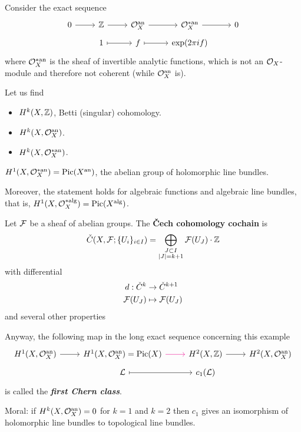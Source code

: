 \begin{example}
	Consider the exact sequence
	\[\begin{tikzcd}[row sep=tiny]
		0\arrow[r]&\Z\arrow[r]&\Oc_X^{\an}\arrow[r]&\Oc_X^{*\an}\arrow[r]&0\\
		&1\arrow[r,maps to]&f\arrow[r,maps to]&\exp(2\pi if)
	\end{tikzcd}\]
	where $\mathcal{O}_X^{*\mathrm{an}}$ is the sheaf of invertible analytic functions, which is not an $\mathcal{O}_X$-module and therefore not coherent (while $\mathcal{O}_X^{\mathrm{an}}$ is).

	Let us find
	\begin{itemize}
		\item $H^k(X,\mathbb{Z})$, Betti (singular) cohomology.
		\item $H^k(X,\mathcal{O}_X^{\mathrm{an}})$.
		\item $H^k(X,\mathcal{O}^{*\mathrm{an}}_X)$.
	\end{itemize}
	\begin{claim}
		$H^1(X,\mathcal{O}_X^{*\mathrm{an}})=\operatorname{Pic}(X^{\mathrm{an}})$, the abelian group of holomorphic line bundles.
		
		Moreover, the statement holds for algebraic functions and algebraic line bundles, that is, $H^1(X,\mathcal{O}_X^{*\mathrm{alg}})=\operatorname{Pic}(X^{\mathrm{alg}})$.
	\end{claim}
	\begin{defn}
		Let $\mathcal{F}$ be a sheaf of abelian groups. The \textbf{\v Cech cohomology cochain} is
		\[\check{C}(X,\mathcal{F};\{U_i\}_{i\in I})=\bigoplus_{\substack{J\subset I\\|J|=k+1}}\mathcal{F}(U_J)\cdot\mathbb{Z}\]
		with differential
		\begin{align*}
			d:\check{C}^k&\to\check{C}^{k+1}\\
			\mathcal{F}(U_J)&\mapsto \mathcal{F}(U_{J})
		\end{align*}
		and several other properties
	\end{defn}
	Anyway, the following map in the long exact sequence concerning this example
	\[\begin{tikzcd}[row sep=tiny]
		H^1(X,\Oc^{\an}_X)\arrow[r]&H^1(X,\Oc^{\an}_X)=\Pic(X)\arrow[r,magenta]&H^2(X,\Z)\arrow[r]&H^2(X,\Oc^{\an}_X)\\
		&\Lc\arrow[r,maps to]&c_1(\Lc)
	\end{tikzcd}\]
	is called the \textbf{\textit{first Chern class}}.
	
	Moral: if $H^k(X,\mathcal{O}_X^{\mathrm{an}})=0$ for $k=1$ and $k=2$ then $c_1$ gives an isomorphism of holomorphic line bundles to topological line bundles.
\end{example}

